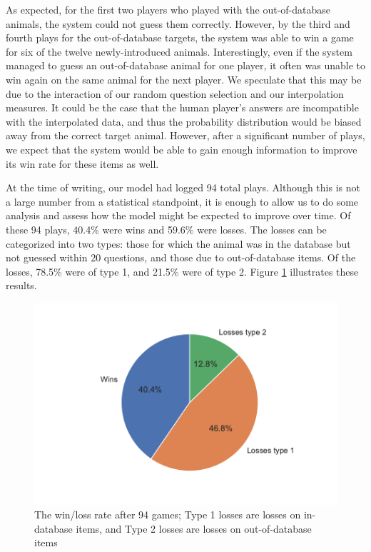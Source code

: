 \documentclass[11pt,a4paper]{article}
\begin{document}
As expected, for the first two players who played with the out-of-database animals, the system could not guess them correctly.
However, by the third and fourth plays for the out-of-database targets, the system was able to win a game for six of the twelve newly-introduced animals.
Interestingly, even if the system managed to guess an out-of-database animal for one player, it often was unable to win again on the same animal for the next player.
We speculate that this may be due to the interaction of our random question selection and our interpolation measures. 
It could be the case that the human player's answers are incompatible with the interpolated data, and thus the probability distribution would be biased away from the correct target animal. 
However, after a significant number of plays, we expect that the system would be able to gain enough information to improve its win rate for these items as well.

At the time of writing, our model had logged 94 total plays. Although this is not a large number from a statistical standpoint, it is enough to allow us to do some analysis and assess how the model might be expected to improve over time. Of these 94 plays, 40.4\% were wins and 59.6\% were losses. The losses can be categorized into two types: those for which the animal was in the database but not guessed within 20 questions, and those due to out-of-database items. Of the losses, 78.5\% were of type 1, and 21.5\% were of type 2. 
Figure \ref{fig:wins-losses} illustrates these results. 

\begin{figure}
    \centering
    \includegraphics[width=\linewidth]{graphics/pie_detailed-winsLosses.pdf}
    \caption{The win/loss rate after 94 games; Type 1 losses are losses on in-database items, and Type 2 losses are losses on out-of-database items}
    \label{fig:wins-losses}
\end{figure}
\end{document}
